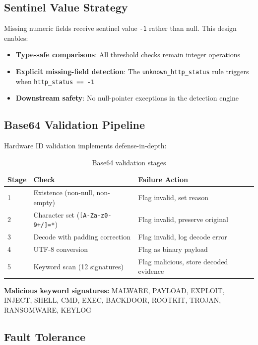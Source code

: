 \documentclass[12pt,a4paper]{article}
\begin{document}
\subsection{Sentinel Value Strategy}

Missing numeric fields receive sentinel value \texttt{-1} rather than null. This design enables:

\begin{itemize}[noitemsep]
    \item \textbf{Type-safe comparisons}: All threshold checks remain integer operations
    \item \textbf{Explicit missing-field detection}: The \texttt{unknown\_http\_status} rule triggers when \texttt{http\_status == -1}
    \item \textbf{Downstream safety}: No null-pointer exceptions in the detection engine
\end{itemize}

\subsection{Base64 Validation Pipeline}

Hardware ID validation implements defense-in-depth:

\begin{table}[H]
\centering
\begin{tabularx}{\linewidth}{l X l}
\toprule
\textbf{Stage} & \textbf{Check} & \textbf{Failure Action} \\
\midrule
1 & Existence (non-null, non-empty) & Flag invalid, set reason \\
2 & Character set (\texttt{[A-Za-z0-9+/]=*}) & Flag invalid, preserve original \\
3 & Decode with padding correction & Flag invalid, log decode error \\
4 & UTF-8 conversion & Flag as binary payload \\
5 & Keyword scan (12 signatures) & Flag malicious, store decoded evidence \\
\bottomrule
\end{tabularx}
\caption{Base64 validation stages}
\end{table}

\textbf{Malicious keyword signatures:} MALWARE, PAYLOAD, EXPLOIT, INJECT, SHELL, CMD, EXEC, BACKDOOR, ROOTKIT, TROJAN, RANSOMWARE, KEYLOG

\subsection{Fault Tolerance}
\end{document}
